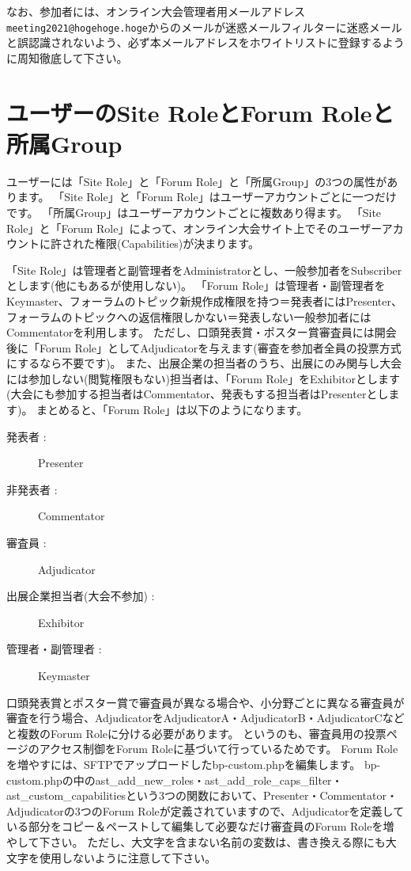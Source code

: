 \documentclass[titlepage,10pt,a4paper,uplatex]{jsbook}
\begin{document}
なお、参加者には、オンライン大会管理者用メールアドレス\texttt{meeting2021@hogehoge.hoge}からのメールが迷惑メールフィルターに迷惑メールと誤認識されないよう、必ず本メールアドレスをホワイトリストに登録するように周知徹底して下さい。

\section{ユーザーのSite RoleとForum Roleと所属Group}

ユーザーには「Site Role」と「Forum Role」と「所属Group」の3つの属性があります。
「Site Role」と「Forum Role」はユーザーアカウントごとに一つだけです。
「所属Group」はユーザーアカウントごとに複数あり得ます。
「Site Role」と「Forum Role」によって、オンライン大会サイト上でそのユーザーアカウントに許された権限(Capabilities)が決まります。

「Site Role」は管理者と副管理者をAdministratorとし、一般参加者をSubscriberとします(他にもあるが使用しない)。
「Forum Role」は管理者・副管理者をKeymaster、フォーラムのトピック新規作成権限を持つ＝発表者にはPresenter、フォーラムのトピックへの返信権限しかない＝発表しない一般参加者にはCommentatorを利用します。
ただし、口頭発表賞・ポスター賞審査員には開会後に「Forum Role」としてAdjudicatorを与えます(審査を参加者全員の投票方式にするなら不要です)。
また、出展企業の担当者のうち、出展にのみ関与し大会には参加しない(閲覧権限もない)担当者は、「Forum Role」をExhibitorとします(大会にも参加する担当者はCommentator、発表もする担当者はPresenterとします)。
まとめると、「Forum Role」は以下のようになります。

\begin{description}
\item[発表者 : ] Presenter
\item[非発表者 : ] Commentator
\item[審査員 : ] Adjudicator
\item[出展企業担当者(大会不参加) : ] Exhibitor
\item[管理者・副管理者 : ] Keymaster
\end{description}

口頭発表賞とポスター賞で審査員が異なる場合や、小分野ごとに異なる審査員が審査を行う場合、AdjudicatorをAdjudicatorA・AdjudicatorB・AdjudicatorCなどと複数のForum Roleに分ける必要があります。
というのも、審査員用の投票ページのアクセス制御をForum Roleに基づいて行っているためです。
Forum Roleを増やすには、SFTPでアップロードしたbp-custom.phpを編集します。
bp-custom.phpの中のast\_add\_new\_roles・ast\_add\_role\_caps\_filter・ast\_custom\_capabilitiesという3つの関数において、Presenter・Commentator・Adjudicatorの3つのForum Roleが定義されていますので、Adjudicatorを定義している部分をコピー＆ペーストして編集して必要なだけ審査員のForum Roleを増やして下さい。
ただし、大文字を含まない名前の変数は、書き換える際にも大文字を使用しないように注意して下さい。
\end{document}
